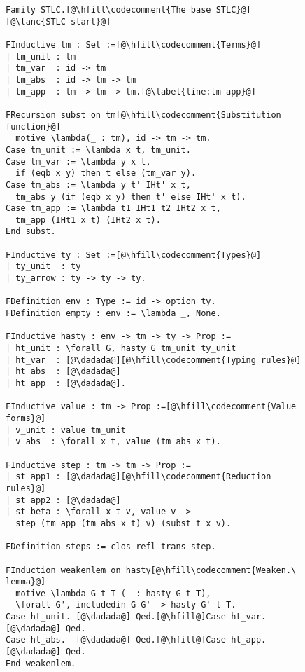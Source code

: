 \begin{figure}
\begin{minipage}{\textwidth}
\begin{multicols}{2}



\begin{lstlisting}
Family STLC.[@\hfill\codecomment{The base STLC}@][@\tanc{STLC-start}@]

FInductive tm : Set :=[@\hfill\codecomment{Terms}@]
| tm_unit : tm
| tm_var  : id -> tm
| tm_abs  : id -> tm -> tm
| tm_app  : tm -> tm -> tm.[@\label{line:tm-app}@]

FRecursion subst on tm[@\hfill\codecomment{Substitution function}@] 
  motive \lambda(_ : tm), id -> tm -> tm.
Case tm_unit := \lambda x t, tm_unit.
Case tm_var := \lambda y x t,
  if (eqb x y) then t else (tm_var y).
Case tm_abs := \lambda y t' IHt' x t,
  tm_abs y (if (eqb x y) then t' else IHt' x t).
Case tm_app := \lambda t1 IHt1 t2 IHt2 x t,
  tm_app (IHt1 x t) (IHt2 x t).
End subst.

FInductive ty : Set :=[@\hfill\codecomment{Types}@]
| ty_unit  : ty
| ty_arrow : ty -> ty -> ty.

FDefinition env : Type := id -> option ty.
FDefinition empty : env := \lambda _, None.

FInductive hasty : env -> tm -> ty -> Prop :=
| ht_unit : \forall G, hasty G tm_unit ty_unit
| ht_var  : [@\dadada@][@\hfill\codecomment{Typing rules}@]
| ht_abs  : [@\dadada@]
| ht_app  : [@\dadada@].

FInductive value : tm -> Prop :=[@\hfill\codecomment{Value forms}@]
| v_unit : value tm_unit
| v_abs  : \forall x t, value (tm_abs x t).

FInductive step : tm -> tm -> Prop :=
| st_app1 : [@\dadada@][@\hfill\codecomment{Reduction rules}@]
| st_app2 : [@\dadada@]
| st_beta : \forall x t v, value v ->
  step (tm_app (tm_abs x t) v) (subst t x v).

FDefinition steps := clos_refl_trans step.

FInduction weakenlem on hasty[@\hfill\codecomment{Weaken.\ lemma}@]
  motive \lambda G t T (_ : hasty G t T),
  \forall G', includedin G G' -> hasty G' t T.
Case ht_unit. [@\dadada@] Qed.[@\hfill@]Case ht_var. [@\dadada@] Qed.
Case ht_abs.  [@\dadada@] Qed.[@\hfill@]Case ht_app. [@\dadada@] Qed.
End weakenlem.


\end{lstlisting}
\end{multicols}
\end{minipage}
\end{figure}
